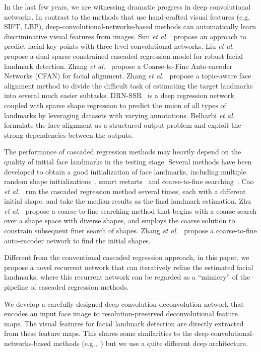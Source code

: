 \documentclass[journal]{IEEEtran}
\begin{document}
In the last few years, we are witnessing dramatic progress in deep convolutional networks. In contrast to the methods that use hand-crafted visual features (e.g, SIFT, LBP), deep-convolutional-networks-based methods can automatically learn discriminative visual features from images. Sun \textit{et al.}~\cite{sun2013deep} propose an approach to predict facial key points with three-level convolutional networks. Liu \textit{et al.}~\cite{liu2015dual} propose a dual sparse constrained cascaded regression model for robust facial landmark detection. Zhang \textit{et al.}~\cite{zhang2014coarse} propose a Coarse-to-Fine Auto-encoder Networks (CFAN) for facial alignment. Zhang \textit{et al.}~\cite{zhang2014topic} propose a topic-aware face alignment method to divide the difficult task of estimating the target landmarks into several much easier subtasks. DRN-SSR~\cite{zhang2015leveraging} is a deep regression network coupled with sparse shape regression to predict the union of all types of landmarks by leveraging datasets with varying annotations. Belharbi \textit{et al.}\cite{belharbi2015facial} formulate the face alignment as a structured output problem and exploit the strong dependencies between the outputs.

The performance of cascaded regression methods may heavily depend on the quality of initial face landmarks in the testing stage. Several methods have been developed to  obtain a good initialization of face landmarks, including multiple random shape initializations~\cite{cao2014face}, smart restarts~\cite{burgos2013robust} and coarse-to-fine searching~\cite{cfss,sun2013deep,zhang2014coarse}. Cao \textit{et al.}~\cite{cao2014face} run the cascaded regression method several times, each with a different initial shape, and take the median results as the final landmark estimation. Zhu \textit{et al.}~\cite{cfss} propose a coarse-to-fine searching method that begins with a coarse search over a shape space with diverse shapes, and employs the coarse solution
to constrain subsequent finer search of shapes. Zhang \textit{et al.}~\cite{zhang2014coarse} propose a coarse-to-fine auto-encoder network to find the initial shapes.

Different from the conventional cascaded regression approach, in this paper, we propose a novel recurrent network that can iteratively refine the estimated facial landmarks, where this recurrent network can be regarded as a ``mimicry'' of the pipeline of cascaded regression methods.

We develop a carefully-designed deep convolution-deconvolution network that encodes an input face image to resolution-preserved deconvolutional feature maps. The visual features for facial landmark detection are directly extracted from these feature maps. This shares some similarities to the deep-convolutional-networks-based methods (e.g.,~\cite{sun2013deep,zhang2014coarse,liu2015dual}) but we use a quite different deep architecture.
\end{document}
